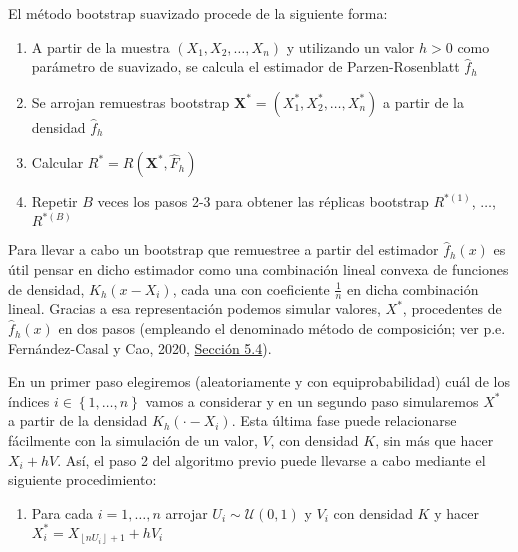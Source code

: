 \documentclass[
]{book}
\providecommand{\tightlist}{%
  \setlength{\itemsep}{0pt}\setlength{\parskip}{0pt}}
\theoremstyle{break}
\theoremstyle{definition}
\theoremstyle{definition}
\theoremstyle{definition}
\theoremstyle{definition}
\theoremstyle{remark}
\begin{document}
El método bootstrap suavizado procede de la siguiente forma:

\begin{enumerate}
\def\labelenumi{\arabic{enumi}.}
\item
  A partir de la muestra \(\left( X_1,X_2,\ldots ,X_n \right)\) y
  utilizando un valor \(h>0\) como parámetro de suavizado, se calcula el
  estimador de Parzen-Rosenblatt \(\hat{f}_{h}\)
\item
  Se arrojan remuestras bootstrap \(\mathbf{X}^{\ast}=\left( X_1^{\ast},X_2^{\ast},\ldots ,X_n^{\ast} \right)\) a partir de
  la densidad \(\hat{f}_{h}\)
\item
  Calcular
  \(R^{\ast}=R\left( \mathbf{X}^{\ast},\hat{F}_{h} \right)\)
\item
  Repetir \(B\) veces los pasos 2-3 para obtener las réplicas bootstrap
  \(R^{\ast (1)}\), \(\ldots\), \(R^{\ast (B)}\)
\end{enumerate}

Para llevar a cabo un bootstrap que remuestree a partir del estimador
\(\hat{f}_{h}\left( x \right)\) es útil pensar en dicho estimador como una
combinación lineal convexa de funciones de densidad, \(K_{h}\left( x-X_i \right)\), cada una con coeficiente \(\frac{1}{n}\) en dicha
combinación lineal. Gracias a esa representación podemos simular
valores,
\(X^{\ast}\), procedentes de \(\hat{f}_{h}\left( x \right)\) en dos pasos (empleando el denominado método de composición; ver p.e. Fernández-Casal y Cao, 2020, \href{https://rubenfcasal.github.io/simbook/m\%C3\%A9todo-de-composici\%C3\%B3n.html}{Sección 5.4}).

En un primer paso elegiremos (aleatoriamente y con equiprobabilidad)
cuál de los índices \(i\in \left\{ 1,\ldots ,n\right\}\) vamos a
considerar y en un segundo paso simularemos \(X^{\ast}\) a partir de la
densidad \(K_{h}\left( \cdot -X_i \right)\). Esta última fase puede relacionarse fácilmente
con la simulación de un valor, \(V\), con densidad \(K\), sin más que hacer
\(X_i+hV\). Así, el paso 2 del algoritmo previo puede llevarse a cabo
mediante el siguiente procedimiento:

\begin{enumerate}
\def\labelenumi{\arabic{enumi}.}
\setcounter{enumi}{1}
\tightlist
\item
  Para cada \(i=1,\ldots ,n\) arrojar \(U_i\sim \mathcal{U}\left( 0,1 \right)\) y
  \(V_i\) con densidad \(K\) y hacer \(X_i^{\ast}=X_{\left\lfloor nU_i\right\rfloor +1}+hV_i\)
\end{enumerate}
\end{document}
